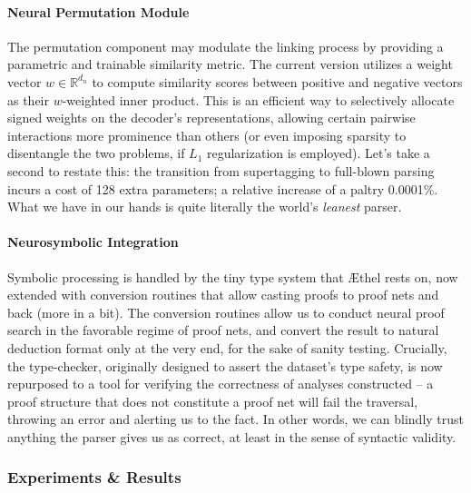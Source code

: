 \paragraph{Neural Permutation Module}
The permutation component may modulate the linking process by providing a parametric and trainable similarity metric.
The current version utilizes a weight vector $w \in \mathbb{R}^{d_n}$ to compute similarity scores between positive and negative vectors as their $w$-weighted inner product.
This is an efficient way to selectively allocate signed weights on the decoder's representations, allowing certain pairwise interactions more prominence than others (or even imposing sparsity to disentangle the two problems, if $L_1$ regularization is employed).
Let's take a second to restate this: the transition from supertagging to full-blown parsing incurs a cost of 128 extra parameters; a relative increase of a paltry 0.0001\%.
What we have in our hands is quite literally the world's \textit{leanest} parser.

\paragraph{Neurosymbolic Integration}
Symbolic processing is handled by the tiny type system that \AE thel rests on, now extended with conversion routines that allow casting proofs to proof nets and back (more in a bit).
The conversion routines allow us to conduct neural proof search in the favorable regime of proof nets, and convert the result to natural deduction format only at the very end, for the sake of sanity testing.
Crucially, the type-checker, originally designed to assert the dataset's type safety, is now repurposed to a tool for verifying the correctness of analyses constructed -- a proof structure that does not constitute a proof net will fail the traversal, throwing an error and alerting us to the fact.
In other words, we can blindly trust anything the parser gives us as correct, at least in the sense of syntactic validity.

\subsubsection{Experiments \& Results}
